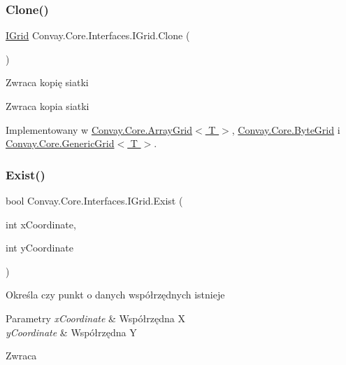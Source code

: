 \subsubsection{\texorpdfstring{Clone()}{Clone()}}
{\footnotesize\ttfamily \hyperlink{interface_convay_1_1_core_1_1_interfaces_1_1_i_grid}{I\+Grid} Convay.\+Core.\+Interfaces.\+I\+Grid.\+Clone (\begin{DoxyParamCaption}{ }\end{DoxyParamCaption})}



Zwraca kopię siatki 

\begin{DoxyReturn}{Zwraca}
kopia siatki
\end{DoxyReturn}


Implementowany w \hyperlink{class_convay_1_1_core_1_1_array_grid_a139eba7f8a6780b4ecbc446959e159ad}{Convay.\+Core.\+Array\+Grid$<$ T $>$}, \hyperlink{class_convay_1_1_core_1_1_byte_grid_aff3101705112bb6f708d694b34a7e5f2}{Convay.\+Core.\+Byte\+Grid} i \hyperlink{class_convay_1_1_core_1_1_generic_grid_af2556688d2c1a33797ce8f79d15836b4}{Convay.\+Core.\+Generic\+Grid$<$ T $>$}.

\hypertarget{interface_convay_1_1_core_1_1_interfaces_1_1_i_grid_a269281497dd5a218f1505d97b51d45b4}{}\label{interface_convay_1_1_core_1_1_interfaces_1_1_i_grid_a269281497dd5a218f1505d97b51d45b4} 
\subsubsection{\texorpdfstring{Exist()}{Exist()}}
{\footnotesize\ttfamily bool Convay.\+Core.\+Interfaces.\+I\+Grid.\+Exist (\begin{DoxyParamCaption}\item[{int}]{x\+Coordinate,  }\item[{int}]{y\+Coordinate }\end{DoxyParamCaption})}



Określa czy punkt o danych współrzędnych istnieje 


\begin{DoxyParams}{Parametry}
{\em x\+Coordinate} & Współrzędna X\\
\hline
{\em y\+Coordinate} & Współrzędna Y\\
\hline
\end{DoxyParams}
\begin{DoxyReturn}{Zwraca}

\end{DoxyReturn}


